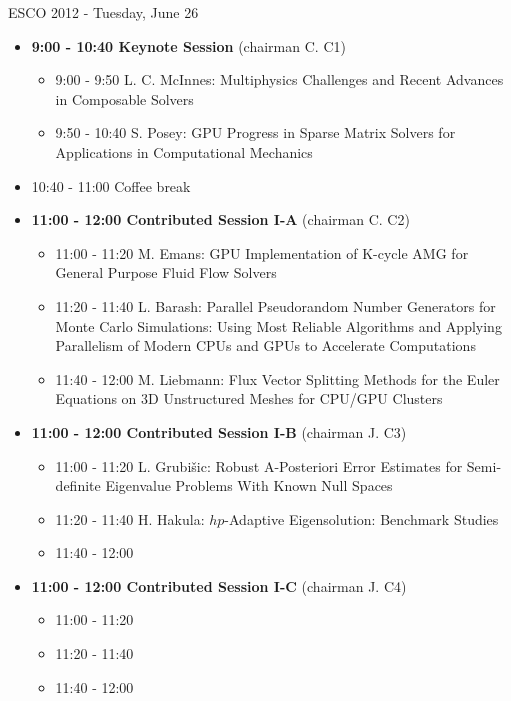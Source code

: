 \documentclass[10pt, A4]{article}%
\begin{document}
\newpage

\centerline{\huge ESCO 2012 - Tuesday, June 26}
\vspace{4mm}

\begin{itemize}    
  \item {\bf 9:00 - 10:40 Keynote Session} (chairman C. C1) 
  \begin{itemize}
    \item 9:00 - 9:50 L. C. McInnes: Multiphysics Challenges and Recent Advances in Composable Solvers
    \item 9:50 - 10:40 S. Posey: GPU Progress in Sparse Matrix Solvers for Applications in Computational Mechanics
  \end{itemize}
  \item 10:40 - 11:00 Coffee break
  \item {\bf 11:00 - 12:00 Contributed Session I-A} (chairman C. C2) 
  \begin{itemize}
    \item 11:00 - 11:20 M. Emans: GPU Implementation of K-cycle AMG for General Purpose Fluid Flow Solvers
    \item 11:20 - 11:40 L. Barash: Parallel Pseudorandom Number Generators for Monte Carlo Simulations: Using Most Reliable Algorithms and Applying Parallelism
of Modern CPUs and GPUs to Accelerate Computations
    \item 11:40 - 12:00 M. Liebmann: Flux Vector Splitting Methods for the Euler Equations on 3D Unstructured Meshes for CPU/GPU Clusters
  \end{itemize}
  \item {\bf 11:00 - 12:00 Contributed Session I-B} (chairman J. C3) 
  \begin{itemize}
    \item 11:00 - 11:20 L. Grubi\v{s}ic: Robust A-Posteriori Error Estimates for Semi-definite Eigenvalue Problems With Known Null Spaces
    \item 11:20 - 11:40 H. Hakula: $hp$-Adaptive Eigensolution: Benchmark Studies
    \item 11:40 - 12:00 
  \end{itemize}
  \item {\bf 11:00 - 12:00 Contributed Session I-C} (chairman J. C4) 
  \begin{itemize}
    \item 11:00 - 11:20 
    \item 11:20 - 11:40 
    \item 11:40 - 12:00

\end{itemize}
\end{itemize}
\end{document}
